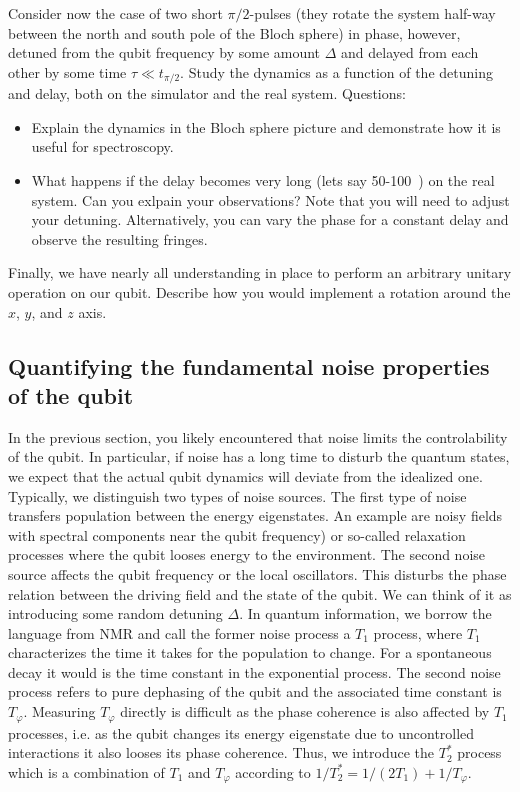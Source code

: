\documentclass{../lab}
\begin{document}
Consider now the case of two short $\pi/2$-pulses (they rotate the system half-way between the north and south pole of the Bloch sphere) in phase, however, detuned from the qubit frequency by some amount $\Delta$ and delayed from each other by some time $\tau \ll t_{\pi/2}$. Study the dynamics as a function of the detuning and delay, both on the simulator and the real system. 
Questions:
\begin{itemize}
\item Explain the dynamics in the Bloch sphere picture and demonstrate how it is useful for spectroscopy. \item What happens if the delay becomes very long (lets say 50-100~) on the real system. Can you exlpain your observations? Note that you will need to adjust your detuning. Alternatively, you can vary the phase for a constant delay and observe the resulting fringes. 
\end{itemize}

Finally, we have nearly all understanding in place to perform an arbitrary unitary operation on our qubit. Describe how you would implement a rotation around the $x$, $y$, and $z$ axis.   

\subsection{Quantifying the fundamental noise
properties of the qubit}
In the previous section, you likely encountered that noise limits the controlability of the qubit. In particular, if noise has a long time to disturb the quantum states, we expect that the actual qubit dynamics will deviate from the idealized one. Typically, we distinguish two types of noise sources. The first type of noise transfers population between the energy eigenstates. An example are noisy fields with spectral components near the qubit frequency) or so-called relaxation processes where the qubit looses energy to the environment. The second noise source affects the qubit frequency or the local oscillators. This disturbs the phase relation between the driving field and the state of the qubit. We can think of it as introducing some random detuning $\Delta$. In quantum information, we borrow the language from NMR and call the former noise process a $T_1$ process, where $T_1$ characterizes the time it takes for the population to change. For a spontaneous decay it would is the time constant in the exponential process. The second noise process refers to pure dephasing of the qubit and the associated time constant is $T_\varphi$. Measuring $T_\varphi$ directly is difficult as the phase coherence is also affected by $T_1$ processes, i.e. as the qubit changes its energy eigenstate due to uncontrolled interactions it also looses its phase coherence. Thus, we introduce the $T_2^*$ process which is a combination of $T_1$ and $T_\varphi$ according to $1/T_2^*=1/(2T_1)+1/T_\varphi$.
\end{document}
